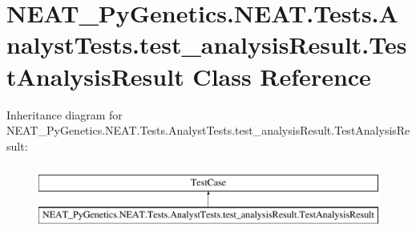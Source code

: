 \hypertarget{class_n_e_a_t___py_genetics_1_1_n_e_a_t_1_1_tests_1_1_analyst_tests_1_1test__analysis_result_1_1_test_analysis_result}{}\section{N\+E\+A\+T\+\_\+\+Py\+Genetics.\+N\+E\+A\+T.\+Tests.\+Analyst\+Tests.\+test\+\_\+analysis\+Result.\+Test\+Analysis\+Result Class Reference}
\label{class_n_e_a_t___py_genetics_1_1_n_e_a_t_1_1_tests_1_1_analyst_tests_1_1test__analysis_result_1_1_test_analysis_result}
Inheritance diagram for N\+E\+A\+T\+\_\+\+Py\+Genetics.\+N\+E\+A\+T.\+Tests.\+Analyst\+Tests.\+test\+\_\+analysis\+Result.\+Test\+Analysis\+Result\+:\begin{figure}[H]
\begin{center}
\leavevmode
\includegraphics[height=2.000000cm]{class_n_e_a_t___py_genetics_1_1_n_e_a_t_1_1_tests_1_1_analyst_tests_1_1test__analysis_result_1_1_test_analysis_result}
\end{center}
\end{figure}
